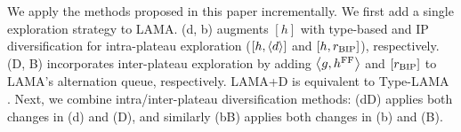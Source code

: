 

% 


We apply the methods proposed in this paper incrementally.
We first add a single exploration strategy to LAMA.
(d, b) augments $[h]$ with type-based and IP diversification for intra-plateau exploration ($[h,{\left<d\right>}]$ and $[h,r_\text{BIP}]$), respectively.
(D, B) incorporates inter-plateau exploration by adding ${\left<g,\text{$h^\text{FF}$}\right>}$ and $[r_\text{BIP}]$ to LAMA's alternation queue, respectively.
LAMA+D is equivalent to Type-LAMA \cite{xie14type}.
Next, we combine intra/inter-plateau diversification methods:
(dD) applies both changes in (d) and (D), and similarly (bB) applies both changes in (b) and (B).

